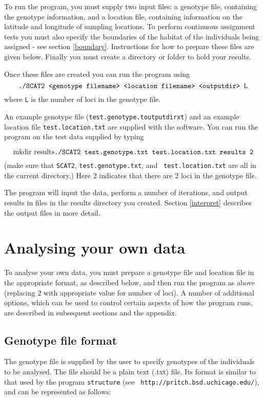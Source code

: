 \documentclass[11pt,titlepage,times,letterpaper]{article}
\begin{document}
To run the program, you must supply two input files: a genotype file,
containing the genotype information, and a location file, containing
information on the latitude and longitude of sampling locations. To
perform continuous assignment tests you must also specify the
boundaries of the habitat of the individuals being assigned - see
section \ref{boundary}.  Instructions for how to prepare these files
are given below. Finally you must create a directory or folder to hold your results.

Once these files are created you can run the program
using
$$\text{{\tt ./SCAT2 <genotype filename> <location filename> <outputdir> L}}$$ where {\tt L} is the number of loci in the genotype file.

An example genotype file ({\tt test.genotype.toutputdirxt})
and an example location file {\tt test.location.txt} are supplied with
the software.  You can run the program on the test data supplied by
typing

$$ \text{mkdir results}\\
\text{{\tt ./SCAT2 test.genotype.txt test.location.txt results 2}}$$ 
(make sure that {\tt SCAT2}, {\tt test.genotype.txt}, and {\tt
test.location.txt} are all in the current directory.)  Here 2 indicates that there are 2
loci in the genotype file.

The program will input the data, perform a number of iterations, and
output results in files in the results directory you created. 
Section \ref{interpret} describes the output files in more detail.

\section{Analysing your own data}

To analyse your own data, you must prepare a genotype file and
location file in the appropriate format, as described below, and then
run the program as above (replacing 2 with appropriate value for
number of loci). A number of additional options, which
can be used to control certain aspects of how the program runs, are
described in subsequent sections and the appendix.

\subsection{Genotype file format}
\label{inputfile}

The genotype file is supplied by the user to specify genotypes of the
individuals to be analysed. The file should be a plain text (.txt) file.
Its format is similar to that
used by the program {\tt structure} (see {\tt
http://pritch.bsd.uchicago.edu/}), and can be represented as follows:
\end{document}
